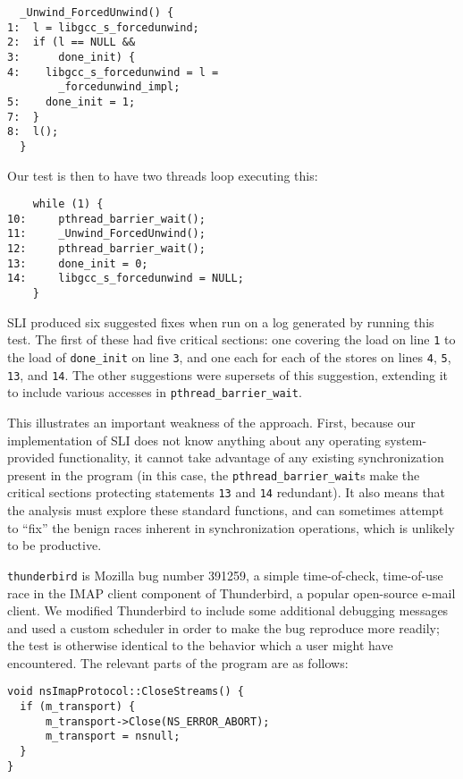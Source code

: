 \documentclass[10pt,twocolumn,preprint,natbib,authoryear]{sigplanconf}
\begin{document}
\begin{verbatim}
  _Unwind_ForcedUnwind() {
1:  l = libgcc_s_forcedunwind;
2:  if (l == NULL &&
3:      done_init) {
4:    libgcc_s_forcedunwind = l =
        _forcedunwind_impl;
5:    done_init = 1;
7:  }
8:  l();
  }
\end{verbatim}

Our test is then to have two threads loop executing this:

\begin{verbatim}
    while (1) {
10:     pthread_barrier_wait();
11:     _Unwind_ForcedUnwind();
12:     pthread_barrier_wait();
13:     done_init = 0;
14:     libgcc_s_forcedunwind = NULL;
    }
\end{verbatim}

SLI produced six suggested fixes when run on a log generated by
running this test.  The first of these had five critical sections: one
covering the load on line \verb|1| to the load of \verb|done_init| on
line \verb|3|, and one each for each of the stores on lines \verb|4|,
\verb|5|, \verb|13|, and \verb|14|.  The other suggestions were
supersets of this suggestion, extending it to include various accesses
in \verb|pthread_barrier_wait|.

This illustrates an important weakness of the approach.  First,
because our implementation of SLI does not know anything about any
operating system-provided functionality, it cannot take advantage of
any existing synchronization present in the program (in this case, the
\verb|pthread_barrier_wait|s make the critical sections protecting
statements \verb|13| and \verb|14| redundant).  It also means that the
analysis must explore these standard functions, and can sometimes
attempt to ``fix'' the benign races inherent in synchronization
operations, which is unlikely to be productive.

\verb|thunderbird| is Mozilla bug number
391259\cite{thunderbird39125}, a simple time-of-check, time-of-use
race in the IMAP client component of Thunderbird, a popular
open-source e-mail client.  We modified Thunderbird to include some
additional debugging messages and used a custom scheduler in order to
make the bug reproduce more readily; the test is otherwise identical
to the behavior which a user might have encountered.  The relevant
parts of the program are as follows:

\begin{verbatim}
void nsImapProtocol::CloseStreams() {
  if (m_transport) {
      m_transport->Close(NS_ERROR_ABORT);
      m_transport = nsnull;
  }
}
\end{verbatim}
\end{document}
